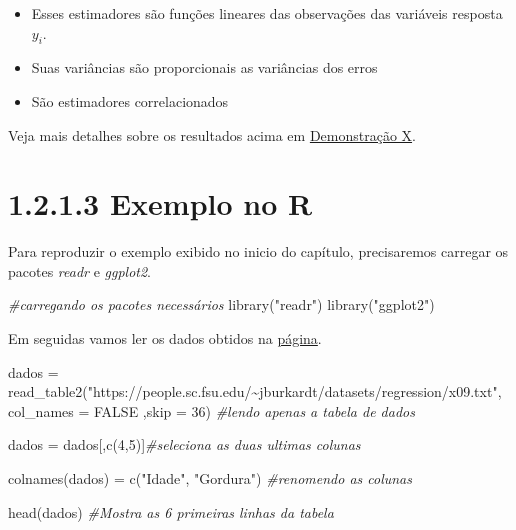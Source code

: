 \documentclass[
]{article}
\newenvironment{Shaded}{\begin{snugshade}}{\end{snugshade}}
\newcommand{\AttributeTok}[1]{\textcolor[rgb]{0.77,0.63,0.00}{#1}}
\newcommand{\CommentTok}[1]{\textcolor[rgb]{0.56,0.35,0.01}{\textit{#1}}}
\newcommand{\ConstantTok}[1]{\textcolor[rgb]{0.00,0.00,0.00}{#1}}
\newcommand{\DecValTok}[1]{\textcolor[rgb]{0.00,0.00,0.81}{#1}}
\newcommand{\FunctionTok}[1]{\textcolor[rgb]{0.00,0.00,0.00}{#1}}
\newcommand{\NormalTok}[1]{#1}
\newcommand{\OtherTok}[1]{\textcolor[rgb]{0.56,0.35,0.01}{#1}}
\newcommand{\StringTok}[1]{\textcolor[rgb]{0.31,0.60,0.02}{#1}}
\begin{document}
\begin{itemize}
\item
  Esses estimadores são funções lineares das observações das variáveis
  resposta \(y_i\).
\item
  Suas variâncias são proporcionais as variâncias dos erros
\item
  São estimadores correlacionados
\end{itemize}

Veja mais detalhes sobre os resultados acima em \href{}{Demonstração X}.

\hypertarget{exemplo-no-r}{%
\section{1.2.1.3 Exemplo no R}\label{exemplo-no-r}}

Para reproduzir o exemplo exibido no inicio do capítulo, precisaremos
carregar os pacotes \emph{readr} e \emph{ggplot2}.

\begin{Shaded}
\begin{Highlighting}[]
\CommentTok{\#carregando os pacotes necessários}
\FunctionTok{library}\NormalTok{(}\StringTok{"readr"}\NormalTok{)}
\FunctionTok{library}\NormalTok{(}\StringTok{"ggplot2"}\NormalTok{)}
\end{Highlighting}
\end{Shaded}

Em seguidas vamos ler os dados obtidos na
\href{https://people.sc.fsu.edu/~jburkardt/datasets/regression/x09.txt}{página}.

\begin{Shaded}
\begin{Highlighting}[]
\NormalTok{dados }\OtherTok{=} \FunctionTok{read\_table2}\NormalTok{(}\StringTok{"https://people.sc.fsu.edu/\textasciitilde{}jburkardt/datasets/regression/x09.txt"}\NormalTok{, }\AttributeTok{col\_names =} \ConstantTok{FALSE}\NormalTok{ ,}\AttributeTok{skip =} \DecValTok{36}\NormalTok{) }\CommentTok{\#lendo apenas a tabela de dados }

\NormalTok{dados }\OtherTok{=}\NormalTok{ dados[,}\FunctionTok{c}\NormalTok{(}\DecValTok{4}\NormalTok{,}\DecValTok{5}\NormalTok{)]}\CommentTok{\#seleciona as duas ultimas colunas}

\FunctionTok{colnames}\NormalTok{(dados) }\OtherTok{=} \FunctionTok{c}\NormalTok{(}\StringTok{"Idade"}\NormalTok{, }\StringTok{"Gordura"}\NormalTok{) }\CommentTok{\#renomendo as colunas}

\FunctionTok{head}\NormalTok{(dados) }\CommentTok{\#Mostra as 6 primeiras linhas da tabela}
\end{Highlighting}
\end{Shaded}
\end{document}
